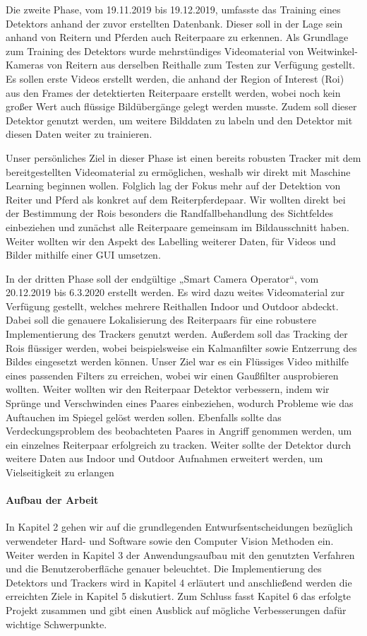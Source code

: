 Die zweite Phase, vom 19.11.2019 bis 19.12.2019, umfasste das Training eines Detektors anhand der zuvor erstellten Datenbank. Dieser soll in der Lage sein anhand von Reitern und Pferden auch Reiterpaare zu erkennen. Als Grundlage zum Training des Detektors wurde mehrstündiges Videomaterial von Weitwinkel-Kameras von Reitern aus derselben Reithalle zum Testen zur Verfügung gestellt. Es sollen erste Videos erstellt werden, die anhand der Region of Interest (Roi) aus den Frames der detektierten Reiterpaare erstellt werden, wobei noch kein großer Wert auch flüssige Bildübergänge gelegt werden musste. Zudem soll dieser Detektor genutzt werden, um weitere Bilddaten zu labeln und den Detektor mit diesen Daten weiter zu trainieren.

Unser persönliches Ziel in dieser Phase ist einen bereits robusten Tracker mit dem bereitgestellten Videomaterial zu ermöglichen, weshalb wir direkt mit Maschine Learning beginnen wollen. Folglich lag der Fokus mehr auf der Detektion von Reiter und Pferd als konkret auf dem Reiterpferdepaar. Wir wollten direkt bei der Bestimmung der Rois besonders die Randfallbehandlung des Sichtfeldes einbeziehen und zunächst alle Reiterpaare gemeinsam im Bildausschnitt haben. Weiter wollten wir den Aspekt des Labelling weiterer Daten, für Videos und Bilder mithilfe einer GUI umsetzen.

In der dritten Phase soll der endgültige „Smart Camera Operator“, vom 20.12.2019 bis 6.3.2020 erstellt werden. Es wird dazu weites Videomaterial zur Verfügung gestellt, welches mehrere Reithallen Indoor und Outdoor abdeckt. Dabei soll die genauere Lokalisierung des Reiterpaars für eine robustere Implementierung des Trackers genutzt werden. Außerdem soll das Tracking der Rois flüssiger werden, wobei beispielsweise ein Kalmanfilter sowie Entzerrung des Bildes eingesetzt werden können.
Unser Ziel war es ein Flüssiges Video mithilfe eines passenden Filters zu erreichen, wobei wir einen Gaußfilter ausprobieren wollten. Weiter wollten wir den Reiterpaar Detektor verbessern, indem wir Sprünge und Verschwinden eines Paares einbeziehen, wodurch Probleme wie das Auftauchen im Spiegel gelöst werden sollen. Ebenfalls sollte das Verdeckungsproblem des beobachteten Paares in Angriff genommen werden, um ein einzelnes Reiterpaar erfolgreich zu tracken. Weiter sollte der Detektor durch weitere Daten aus Indoor und Outdoor Aufnahmen erweitert werden, um Vielseitigkeit zu erlangen



\paragraph{Aufbau der Arbeit}
In Kapitel 2 gehen wir auf die grundlegenden Entwurfsentscheidungen bezüglich verwendeter Hard- und Software sowie den Computer Vision Methoden ein. Weiter werden in Kapitel 3 der Anwendungsaufbau mit den genutzten Verfahren und die Benutzeroberfläche genauer beleuchtet. Die Implementierung des Detektors und Trackers wird in Kapitel 4 erläutert und anschließend werden die erreichten Ziele in Kapitel 5 diskutiert. Zum Schluss fasst Kapitel 6 das erfolgte Projekt zusammen und gibt einen Ausblick auf mögliche Verbesserungen dafür wichtige Schwerpunkte.
